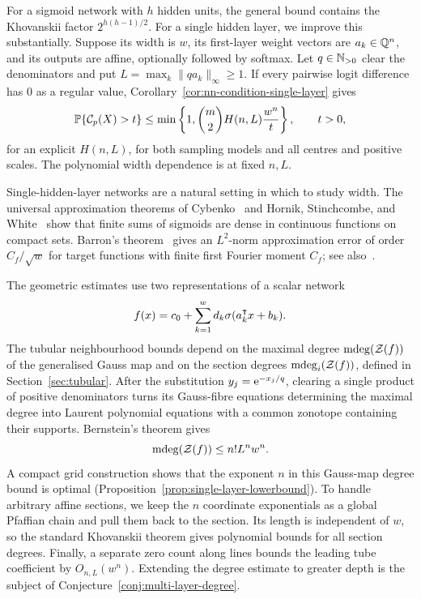 For a sigmoid network with $h$ hidden units, the general bound contains the Khovanskii factor $2^{h(h-1)/2}$. For a single hidden layer,
we improve this substantially. Suppose its width is $w$, its first-layer weight vectors are $a_k\in\mathbb{Q}^n$, and its outputs are affine, optionally followed by softmax. Let $q\in\mathbb{N}_{>0}$ clear the denominators and put $L=\max_k\|qa_k\|_\infty\ge1$. If every pairwise logit difference has $0$ as a regular value, Corollary~\ref{cor:nn-condition-single-layer} gives
\[
\operatorname*{\mathbb{P}}\{\mathcal{C}_p(X)>t\}
\le\min\left\{1,\binom m2 H(n,L)\frac{w^n}{t}\right\},
\qquad t>0,
\]
for an explicit $H(n,L)$, for both sampling models and all centres and positive scales. The polynomial width dependence is at fixed $n,L$. 

Single-hidden-layer networks are a natural setting in which to study width. The universal approximation theorems of Cybenko~\cite{cybenko1989approximation} and Hornik, Stinchcombe, and White~\cite{hornik1989multilayer} show that finite sums of sigmoids are dense in continuous functions on compact sets. Barron's theorem~\cite{barron1993universal} gives an $L^2$-norm approximation error of order $C_f/\sqrt w$ for target functions with finite first Fourier moment $C_f$; see also~\cite{pinkus1999approximation}.

The geometric estimates use two representations of a scalar network
\[
f(x)=c_0+\sum_{k=1}^w d_k\sigma(a_k^{\intercal}x+b_k).
\]
The tubular neighbourhood bounds depend on the maximal degree $\operatorname{\mathrm{mdeg}}(\mathcal Z(f))$ of the generalised Gauss map and on the section degrees $\operatorname{\mathrm{mdeg}}_i(\mathcal Z(f))$, defined in Section~\ref{sec:tubular}.
After the substitution $y_j=\mathrm{e}^{-x_j/q}$, clearing a single product of positive denominators turns its Gauss-fibre equations determining the maximal degree into Laurent polynomial equations with a common zonotope containing their supports. Bernstein's theorem gives
\[
\operatorname{\mathrm{mdeg}}(\mathcal Z(f))\le n!L^nw^n.
\]
A compact grid construction shows that the exponent $n$ in this Gauss-map degree bound is optimal (Proposition~\ref{prop:single-layer-lowerbound}). To handle arbitrary affine sections, we keep the $n$ coordinate exponentials as a global Pfaffian chain and pull them back to the section. Its length is independent of $w$, so the standard Khovanskii theorem gives polynomial bounds for all section degrees. Finally, a separate zero count along lines bounds the leading tube coefficient by $O_{n,L}(w^n)$. Extending the degree estimate to greater depth is the subject of Conjecture~\ref{conj:multi-layer-degree}.

